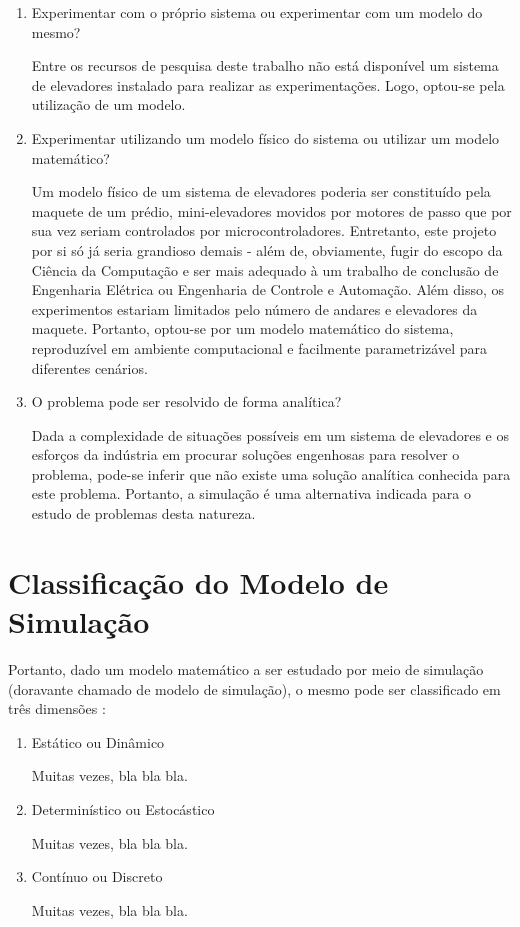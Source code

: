 \begin{enumerate}
\item Experimentar com o próprio sistema ou experimentar com um modelo do mesmo?

Entre os recursos de pesquisa deste trabalho não está disponível um sistema de elevadores instalado para realizar as experimentações. Logo, optou-se pela utilização de um modelo.

\item Experimentar utilizando um modelo físico do sistema ou utilizar um modelo matemático?

Um modelo físico de um sistema de elevadores poderia ser constituído pela maquete de um prédio, mini-elevadores movidos por motores de passo que por sua vez seriam controlados por microcontroladores. Entretanto, este projeto por si só já seria grandioso demais - além de, obviamente, fugir do escopo da Ciência da Computação e ser mais adequado à um trabalho de conclusão de Engenharia Elétrica ou Engenharia de Controle e Automação. Além disso, os experimentos estariam limitados pelo número de andares e elevadores da maquete. Portanto, optou-se por um modelo matemático do sistema, reproduzível em ambiente computacional e facilmente parametrizável para diferentes cenários.

\item O problema pode ser resolvido de forma analítica?

Dada a complexidade de situações possíveis em um sistema de elevadores e os esforços da indústria em procurar soluções engenhosas para resolver o problema, pode-se inferir que não existe uma solução analítica conhecida para este problema. Portanto, a simulação é uma alternativa indicada para o estudo de problemas desta natureza.

\end{enumerate}

\section{Classificação do Modelo de Simulação}

Portanto, dado um modelo matemático a ser estudado por meio de simulação (doravante chamado de modelo de simulação), o mesmo pode ser classificado em três dimensões \cite{Banks,Law}:

\begin{enumerate}
\item Estático ou Dinâmico

Muitas vezes, bla bla bla.
\item Determinístico ou Estocástico

Muitas vezes, bla bla bla.
\item Contínuo ou Discreto

Muitas vezes, bla bla bla.
\end{enumerate}